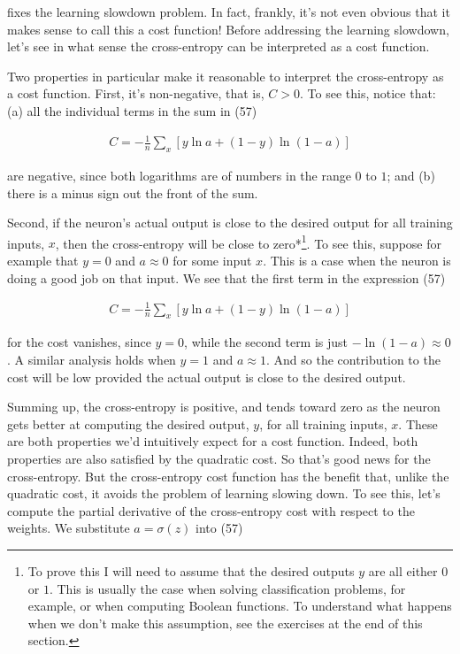 \noindent fixes the learning slowdown problem. In fact, frankly, it's not even obvious that it makes sense to call this a cost function! Before addressing the learning slowdown, let's see in what sense the cross-entropy can be interpreted as a cost function.


Two properties in particular make it reasonable to interpret the cross-entropy as a cost function. First, it's non-negative, that is, $C > 0$. To see this, notice that: (a) all the individual terms in the sum in (57)

\begin{align*}
C = -\frac{1}{n} \sum_x \left[y \ln a + (1-y ) \ln (1-a) \right] \nonumber
\end{align*}

\noindent are negative, since both logarithms are of numbers in the range $0$ to $1$; and (b) there is a minus sign out the front of the sum.


Second, if the neuron's actual output is close to the desired output for all training inputs, $x$, then the cross-entropy will be close to zero*\footnote{To prove this I will need to assume that the desired outputs $y$ are all either $0$ or $1$. This is usually the case when solving classification problems, for example, or when computing Boolean functions. To understand what happens when we don't make this assumption, see the exercises at the end of this section.}. To see this, suppose for example that $y = 0$ and $a \approx 0$ for some input $x$. This is a case when the neuron is doing a good job on that input. We see that the first term in the expression (57)

\begin{align*}
C = -\frac{1}{n} \sum_x \left[y \ln a + (1-y ) \ln (1-a) \right] \nonumber
\end{align*}

\noindent for the cost vanishes, since $y = 0$, while the second term is just $-\ln (1-a) \approx 0$. A similar analysis holds when $y = 1$ and $a \approx 1$. And so the contribution to the cost will be low provided the actual output is close to the desired output.


Summing up, the cross-entropy is positive, and tends toward zero as the neuron gets better at computing the desired output, $y$, for all training inputs, $x$. These are both properties we'd intuitively expect for a cost function. Indeed, both properties are also satisfied by the quadratic cost. So that's good news for the cross-entropy. But the cross-entropy cost function has the benefit that, unlike the quadratic cost, it avoids the problem of learning slowing down. To see this, let's compute the partial derivative of the cross-entropy cost with respect to the weights. We substitute $a = \sigma(z)$ into (57)

